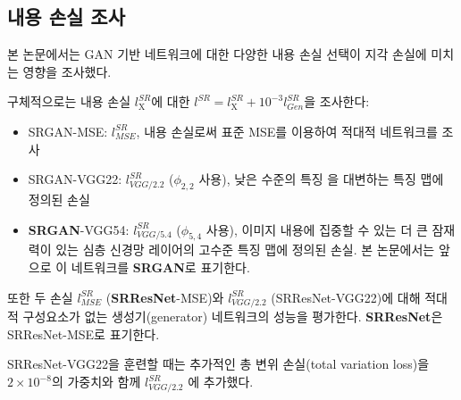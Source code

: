 \documentclass[10pt,twocolumn,letterpaper]{article}
\newcommand{\kor}[1]{#1}
\newcommand{\eng}[1]{}
\begin{document}
\subsection{\eng{Investigation of content loss}\kor{내용 손실 조사}}
\eng{
We investigated the effect of different content loss choices in the perceptual loss for the \ac{GAN}-based networks.
}\kor{
본 논문에서는 \ac{GAN} 기반 네트워크에 대한 다양한 내용 손실 선택이 지각 손실에 미치는 영향을 조사했다.
} \eng{
Specifically we investigate $l^{SR} = l^{SR}_\textrm{X} + 10^{-3}l^{SR}_{Gen}$ for the following content losses $l^{SR}_\textrm{X}$:\\
}\kor{
구체적으로는 내용 손실 $l^{SR}_\textrm{X}$에 대한 $l^{SR} = l^{SR}_\textrm{X} + 10^{-3}l^{SR}_{Gen}$을 조사한다:\\
}
\begin{itemize}
\item \eng{
SRGAN-MSE: $l^{SR}_{MSE}$, to investigate the adversarial network with the standard \ac{MSE} as content loss.
}\kor{
SRGAN-MSE: $l^{SR}_{MSE}$, 내용 손실로써 표준 \ac{MSE}를 이용하여 적대적 네트워크를 조사
}
\item \eng{
SRGAN-VGG22: $l^{SR}_{VGG/2.2}$ with $\phi_{2,2}$, a loss defined on feature maps representing lower-level features \cite{zeiler2014visualizing}.
}\kor{
SRGAN-VGG22: $l^{SR}_{VGG/2.2}$ ($\phi_{2,2}$ 사용), 낮은 수준의 특징 \cite{zeiler2014visualizing}을 대변하는 특징 맵에 정의된 손실
}
\item \eng{
\textbf{SRGAN}-VGG54: $l^{SR}_{VGG/5.4}$ with $\phi_{5,4}$, a loss defined on feature maps of higher level features from deeper network layers with more potential to focus on the content of the images \cite{zeiler2014visualizing,Yosinski2015,Mahendran2016}. We refer to this network as \textbf{SRGAN} in the following.
}\kor{
\textbf{SRGAN}-VGG54: $l^{SR}_{VGG/5.4}$ ($\phi_{5,4}$ 사용), 이미지 내용에 집중할 수 있는 더 큰 잠재력이 있는 심층 신경망 레이어의 고수준 특징 맵에 정의된 손실. 본 논문에서는 앞으로 이 네트워크를 \textbf{SRGAN}로 표기한다.
}
\end{itemize}
\eng{
We also evaluate the performance of the generator network without adversarial component for the two losses $l^{SR}_{MSE}$ (\textbf{SRResNet}-MSE) and $l^{SR}_{VGG/2.2}$ (SRResNet-VGG22). We refer to SRResNet-MSE as \textbf{SRResNet}.
}\kor{
또한 두 손실 $l^{SR}_{MSE}$ (\textbf{SRResNet}-MSE)와 $l^{SR}_{VGG/2.2}$ (SRResNet-VGG22)에 대해 적대적 구성요소가 없는 생성기(generator) 네트워크의 성능을 평가한다. \textbf{SRResNet}은 SRResNet-MSE로 표기한다.
}
\eng{
Note, when training SRResNet-VGG22 we added an additional total variation loss with weight $2\times10^{-8}$ to $l^{SR}_{VGG/2.2}$ \cite{Aly2005,Johnson16PercepLoss}.
}\kor{
SRResNet-VGG22을 훈련할 때는 추가적인 총 변위 손실(total variation loss)을 $2\times10^{-8}$의 가중치와 함께 $l^{SR}_{VGG/2.2}$ \cite{Aly2005,Johnson16PercepLoss}에 추가했다.
}
\end{document}
